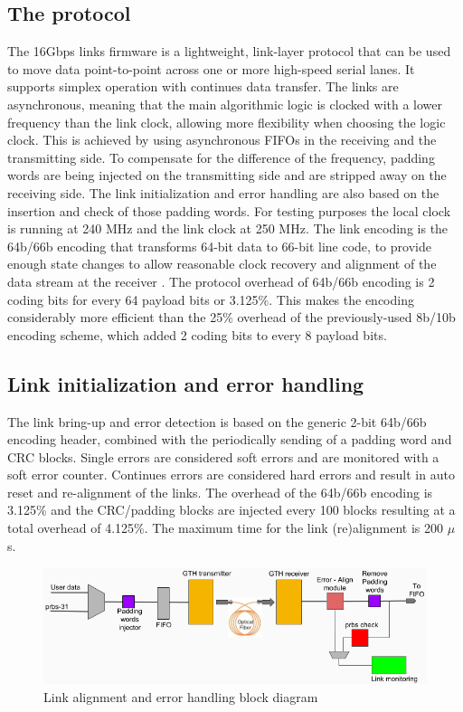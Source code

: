 \documentclass[a4paper]{PoS}
\begin{document}
\subsection{The protocol}
The 16Gbps links firmware is a lightweight, link-layer protocol that can be used to move data point-to-point across one or more high-speed serial lanes. It supports simplex operation with continues data transfer. The links are asynchronous, meaning that the main algorithmic logic is clocked with a lower frequency than the link clock, allowing more flexibility when choosing the logic clock. This is achieved by using asynchronous FIFOs in the receiving and the transmitting side. To compensate for the difference of the frequency, padding words are being injected on the transmitting side and are stripped away on the receiving side. The link initialization and error handling are also based on the insertion and check of those padding words. For testing purposes the local clock is running at 240 MHz and the link clock at 250 MHz. The link encoding is the 64b/66b encoding that transforms 64-bit data to 66-bit line code, to provide enough state changes to allow reasonable clock recovery and alignment of the data stream at the receiver \cite{walker200064b}. The protocol overhead of 64b/66b encoding is 2 coding bits for every 64 payload bits or 3.125\%. This makes the encoding considerably more efficient than the 25\% overhead of the previously-used 8b/10b encoding scheme, which added 2 coding bits to every 8 payload bits.



\subsection{Link initialization and error handling}
The link bring-up and error detection is based on the generic 2-bit 64b/66b encoding header, combined with the periodically sending of a padding word and CRC blocks. Single errors are considered soft errors and are monitored with a soft error counter. Continues errors are considered hard errors and result in auto reset and re-alignment of the links. The overhead of the 64b/66b encoding is 3.125\% and the CRC/padding blocks are injected every 100 blocks resulting at a total overhead of 4.125\%. The maximum time for the link (re)alignment is 200 $\mu$ s.

\begin{figure}
\centering
\includegraphics[width=1\textwidth]{link_align.png}
\caption{Link alignment and error handling block diagram}
\label{align}
\end{figure}
\end{document}
